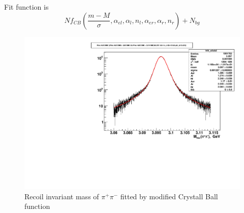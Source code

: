 \documentclass[a4paper,12pt]{article}
\begin{document}
Fit function is
\begin{equation}
N f_{CB}\left( \frac{m - M}{\sigma},  \alpha_{el},\alpha_{l}, n_l,  \alpha_{er}, \alpha_r,  n_r\right)  +  N_{bg}
\end{equation}

\begin{figure}
	\includegraphics[width=\textwidth]{fig/Mrec_fit_double_exp_double_crystal_ball.pdf}
	\caption{Recoil invariant mass of $\pi^+\pi^-$ fitted by 
		modified Crystall Ball function}
\end{figure}
\end{document}
